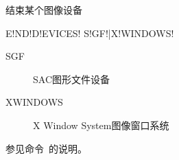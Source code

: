 \label{cmd:enddevices}

结束某个图像设备

\begin{SACSTX}
E!ND!D!EVICES! S!GF!|X!WINDOWS!
\end{SACSTX}

\begin{description}
\item [SGF] SAC图形文件设备
\item [XWINDOWS] X Window System图像窗口系统
\end{description}

参见命令~的说明。

